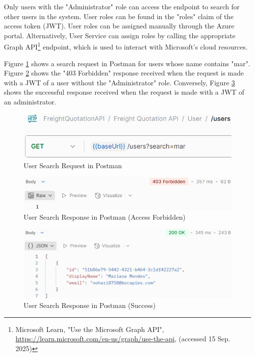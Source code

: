 \documentclass[12pt, reqno]{amsbook}
\theoremstyle{definition}
\theoremstyle{definition}
\numberwithin{section}{chapter}
\numberwithin{table}{chapter}
\numberwithin{figure}{chapter}
\begin{document}
Only users with the "Administrator" role can access the endpoint to search for other users in the system. User roles can be found in the "roles" claim of the access token (\ac{JWT}). User roles can be assigned manually through the Azure portal. Alternatively, User Service can assign roles by calling the appropriate Graph \ac{API}\footnote{Microsoft Learn, "Use the Microsoft Graph API", \url{https://learn.microsoft.com/en-us/graph/use-the-api}, (accessed 15 Sep. 2025)} endpoint, which is used to interact with Microsoft's cloud resources.

Figure \ref{Figure:UserSearchRequestPostman} shows a search request in Postman for users whose name contains "mar". Figure \ref{UserSearchResponsePostmanForbidden} shows the "403 Forbidden" response received when the request is made with a \ac{JWT} of a user without the "Administrator" role. Conversely, Figure \ref{UserSearchResponsePostmanSuccess} shows the successful response received when the request is made with a \ac{JWT} of an administrator.

\begin{figure}[H]
  \centering
  \includegraphics[width=0.7\linewidth]{images/UserSearchRequestPostman.png}
  \caption{\label{Figure:UserSearchRequestPostman}User Search Request in Postman}
\end{figure}

\begin{figure}[H]
  \centering
  \includegraphics[width=0.9\linewidth]{images/UserSearchResponsePostmanForbidden.png}
  \caption{\label{UserSearchResponsePostmanForbidden}User Search Response in Postman (Access Forbidden)}
\end{figure}

\begin{figure}[H]
  \centering
  \includegraphics[width=0.9\linewidth]{images/UserSearchResponsePostmanSuccess.png}
  \caption{\label{UserSearchResponsePostmanSuccess}User Search Response in Postman (Success)}
\end{figure}
\end{document}
